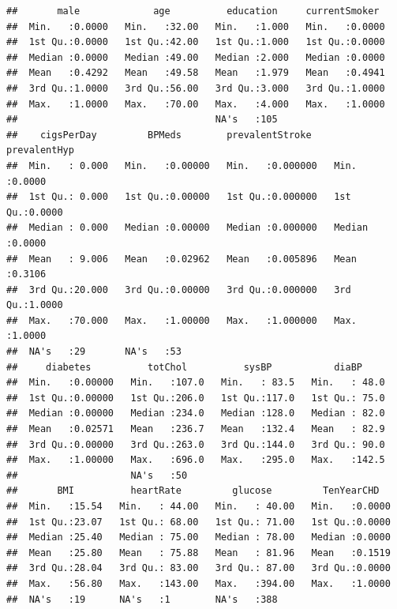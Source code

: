 \documentclass[]{article}
\newenvironment{Shaded}{\begin{snugshade}}{\end{snugshade}}
\newcommand{\KeywordTok}[1]{\textcolor[rgb]{0.13,0.29,0.53}{\textbf{#1}}}
\newcommand{\OperatorTok}[1]{\textcolor[rgb]{0.81,0.36,0.00}{\textbf{#1}}}
\newcommand{\NormalTok}[1]{#1}
\begin{document}
\begin{verbatim}
##       male             age          education     currentSmoker   
##  Min.   :0.0000   Min.   :32.00   Min.   :1.000   Min.   :0.0000  
##  1st Qu.:0.0000   1st Qu.:42.00   1st Qu.:1.000   1st Qu.:0.0000  
##  Median :0.0000   Median :49.00   Median :2.000   Median :0.0000  
##  Mean   :0.4292   Mean   :49.58   Mean   :1.979   Mean   :0.4941  
##  3rd Qu.:1.0000   3rd Qu.:56.00   3rd Qu.:3.000   3rd Qu.:1.0000  
##  Max.   :1.0000   Max.   :70.00   Max.   :4.000   Max.   :1.0000  
##                                   NA's   :105                     
##    cigsPerDay         BPMeds        prevalentStroke     prevalentHyp   
##  Min.   : 0.000   Min.   :0.00000   Min.   :0.000000   Min.   :0.0000  
##  1st Qu.: 0.000   1st Qu.:0.00000   1st Qu.:0.000000   1st Qu.:0.0000  
##  Median : 0.000   Median :0.00000   Median :0.000000   Median :0.0000  
##  Mean   : 9.006   Mean   :0.02962   Mean   :0.005896   Mean   :0.3106  
##  3rd Qu.:20.000   3rd Qu.:0.00000   3rd Qu.:0.000000   3rd Qu.:1.0000  
##  Max.   :70.000   Max.   :1.00000   Max.   :1.000000   Max.   :1.0000  
##  NA's   :29       NA's   :53                                           
##     diabetes          totChol          sysBP           diaBP      
##  Min.   :0.00000   Min.   :107.0   Min.   : 83.5   Min.   : 48.0  
##  1st Qu.:0.00000   1st Qu.:206.0   1st Qu.:117.0   1st Qu.: 75.0  
##  Median :0.00000   Median :234.0   Median :128.0   Median : 82.0  
##  Mean   :0.02571   Mean   :236.7   Mean   :132.4   Mean   : 82.9  
##  3rd Qu.:0.00000   3rd Qu.:263.0   3rd Qu.:144.0   3rd Qu.: 90.0  
##  Max.   :1.00000   Max.   :696.0   Max.   :295.0   Max.   :142.5  
##                    NA's   :50                                     
##       BMI          heartRate         glucose         TenYearCHD    
##  Min.   :15.54   Min.   : 44.00   Min.   : 40.00   Min.   :0.0000  
##  1st Qu.:23.07   1st Qu.: 68.00   1st Qu.: 71.00   1st Qu.:0.0000  
##  Median :25.40   Median : 75.00   Median : 78.00   Median :0.0000  
##  Mean   :25.80   Mean   : 75.88   Mean   : 81.96   Mean   :0.1519  
##  3rd Qu.:28.04   3rd Qu.: 83.00   3rd Qu.: 87.00   3rd Qu.:0.0000  
##  Max.   :56.80   Max.   :143.00   Max.   :394.00   Max.   :1.0000  
##  NA's   :19      NA's   :1        NA's   :388
\end{verbatim}

\begin{Shaded}
\end{Shaded}
\end{document}
